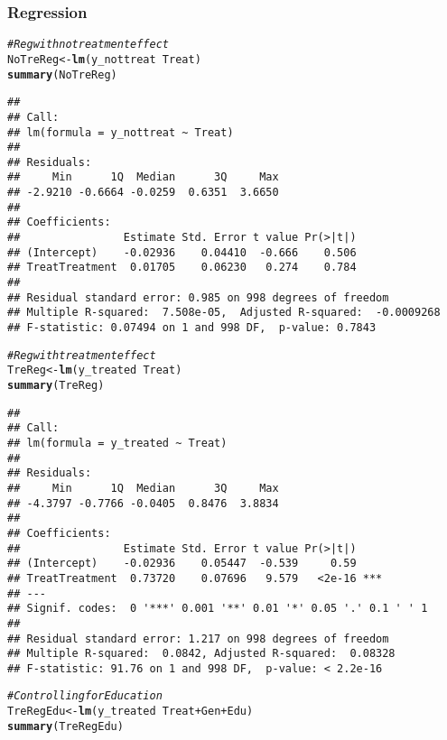 \documentclass[11pt, a4paper]{article}\usepackage[]{graphicx}\usepackage[]{color}
\makeatletter
\newcommand{\hlcom}[1]{\textcolor[rgb]{0.678,0.584,0.686}{\textit{#1}}}%
\newcommand{\hlopt}[1]{\textcolor[rgb]{0,0,0}{#1}}%
\newcommand{\hlstd}[1]{\textcolor[rgb]{0.345,0.345,0.345}{#1}}%
\newcommand{\hlkwb}[1]{\textcolor[rgb]{0.69,0.353,0.396}{#1}}%
\newcommand{\hlkwd}[1]{\textcolor[rgb]{0.737,0.353,0.396}{\textbf{#1}}}%
\newenvironment{kframe}{%
 \def\at@end@of@kframe{}%
 \ifinner\ifhmode%
  \def\at@end@of@kframe{\end{minipage}}%
  \begin{minipage}{\columnwidth}%
 \fi\fi%
 \def\FrameCommand##1{\hskip\@totalleftmargin \hskip-\fboxsep
 \colorbox{shadecolor}{##1}\hskip-\fboxsep
     \hskip-\linewidth \hskip-\@totalleftmargin \hskip\columnwidth}%
 \MakeFramed {\advance\hsize-\width
   \@totalleftmargin\z@ \linewidth\hsize
   \@setminipage}}%
 {\par\unskip\endMakeFramed%
 \at@end@of@kframe}
\newenvironment{knitrout}{}{} %
\makeatother
\begin{document}
\clearpage

    \subsubsection{Regression}

\begin{knitrout}
\color{fgcolor}\begin{kframe}
\begin{alltt}
  \hlcom{#Reg with no treatment effect}
  \hlstd{NoTreReg} \hlkwb{<-} \hlkwd{lm}\hlstd{(y_nottreat} \hlopt{~} \hlstd{Treat)}
  \hlkwd{summary}\hlstd{(NoTreReg)}
\end{alltt}
\begin{verbatim}
## 
## Call:
## lm(formula = y_nottreat ~ Treat)
## 
## Residuals:
##     Min      1Q  Median      3Q     Max 
## -2.9210 -0.6664 -0.0259  0.6351  3.6650 
## 
## Coefficients:
##                Estimate Std. Error t value Pr(>|t|)
## (Intercept)    -0.02936    0.04410  -0.666    0.506
## TreatTreatment  0.01705    0.06230   0.274    0.784
## 
## Residual standard error: 0.985 on 998 degrees of freedom
## Multiple R-squared:  7.508e-05,	Adjusted R-squared:  -0.0009268 
## F-statistic: 0.07494 on 1 and 998 DF,  p-value: 0.7843
\end{verbatim}
\begin{alltt}
  \hlcom{#Reg with treatment effect}
  \hlstd{TreReg} \hlkwb{<-} \hlkwd{lm}\hlstd{(y_treated} \hlopt{~} \hlstd{Treat)}
  \hlkwd{summary}\hlstd{(TreReg)}
\end{alltt}
\begin{verbatim}
## 
## Call:
## lm(formula = y_treated ~ Treat)
## 
## Residuals:
##     Min      1Q  Median      3Q     Max 
## -4.3797 -0.7766 -0.0405  0.8476  3.8834 
## 
## Coefficients:
##                Estimate Std. Error t value Pr(>|t|)    
## (Intercept)    -0.02936    0.05447  -0.539     0.59    
## TreatTreatment  0.73720    0.07696   9.579   <2e-16 ***
## ---
## Signif. codes:  0 '***' 0.001 '**' 0.01 '*' 0.05 '.' 0.1 ' ' 1
## 
## Residual standard error: 1.217 on 998 degrees of freedom
## Multiple R-squared:  0.0842,	Adjusted R-squared:  0.08328 
## F-statistic: 91.76 on 1 and 998 DF,  p-value: < 2.2e-16
\end{verbatim}
\begin{alltt}
  \hlcom{#Controlling for Education}
  \hlstd{TreRegEdu} \hlkwb{<-} \hlkwd{lm}\hlstd{(y_treated} \hlopt{~} \hlstd{Treat} \hlopt{+} \hlstd{Gen} \hlopt{+} \hlstd{Edu)}
  \hlkwd{summary}\hlstd{(TreRegEdu)}

\end{alltt}
\end{kframe}
\end{knitrout}
\end{document}
